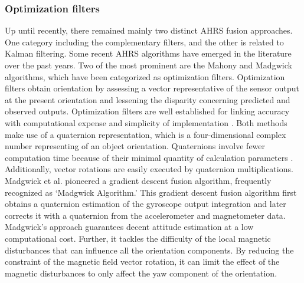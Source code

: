 \subsubsection{Optimization filters}

Up until recently, there remained mainly two distinct AHRS fusion approaches. One category including the complementary filters, and the other is related to Kalman filtering. Some recent AHRS algorithms have emerged in the literature over the past years. Two of the most prominent are the Mahony and Madgwick algorithms, which have been categorized as optimization filters. Optimization filters obtain orientation by assessing a vector representative of the sensor output at the present orientation and lessening the disparity concerning predicted and observed outputs. Optimization filters are well established for linking accuracy with computational expense and simplicity of implementation \cite{madgwick2020extended}.
Both methods make use of a quaternion representation, which is a four-dimensional complex number representing of an object orientation. Quaternions involve fewer computation time because of their minimal quantity of calculation parameters \cite{ludwig2018comparison}. Additionally, vector rotations are easily executed by quaternion multiplications.
Madgwick et al. \cite{madgwick2010efficient} pioneered a gradient descent fusion algorithm, frequently recognized as ‘Madgwick Algorithm.’ This gradient descent fusion algorithm first obtains a quaternion estimation of the gyroscope output integration and later corrects it with a quaternion from the accelerometer and magnetometer data. Madgwick’s approach guarantees decent attitude estimation at a low computational cost. Further, it tackles the difficulty of the local magnetic disturbances that can influence all the orientation components. By reducing the constraint of the magnetic field vector rotation, it can limit the effect of the magnetic disturbances to only affect the yaw component of the orientation.

